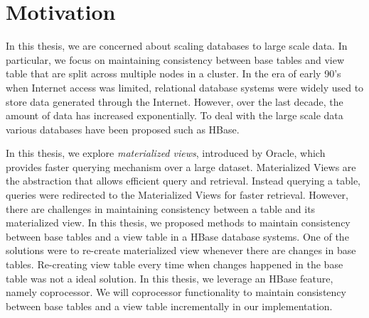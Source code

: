 \documentclass[11pt,a4paper,bibtotoc,idxtotoc,headsepline,footsepline,footexclude,BCOR12mm,DIV13]{scrbook}
\begin{document}

\section{Motivation}
\label{Motivation}


In this thesis, we are concerned about scaling databases to large scale data. In particular, we focus on maintaining consistency between base tables and view table that are split across multiple nodes in a cluster. In the era of early 90's when Internet access was limited, relational database systems were widely used to store data generated through the Internet. However, over the last decade, the amount of data has increased exponentially. To deal with the large scale data various databases have been proposed such as HBase.

In this thesis, we explore \emph{materialized views}, introduced by Oracle, which provides faster querying mechanism over a large dataset. Materialized Views  are the abstraction that allows efficient 
query and retrieval. Instead querying a table, queries were redirected to the Materialized Views for faster retrieval. However, there are challenges in maintaining consistency between a table and its materialized view. In this thesis, we proposed methods to maintain consistency between base tables and a view table in a HBase database systems. One of the solutions were to re-create materialized view whenever there are changes in base tables. Re-creating view table every  time when changes happened in the base table was not a ideal solution. In this thesis, we leverage an HBase feature, namely coprocessor. We will coprocessor functionality to maintain consistency between base tables and a view table incrementally in our implementation.
\end{document}
